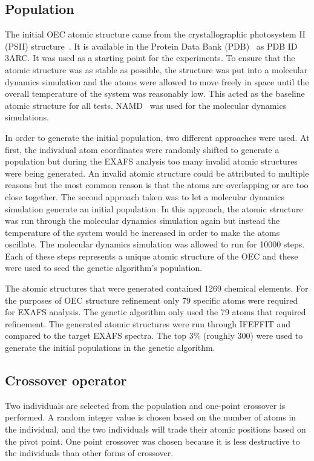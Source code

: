 \documentclass[conference]{IEEEtran}
\begin{document}
\subsection{Population}
\label{sec:population}

The initial OEC atomic structure came from the crystallographic photosystem II (PSII) structure~\cite{umena2011crystal}. It is available in the Protein Data Bank (PDB)~\cite{databank} as PDB ID 3ARC. It was used as a starting point for the experiments. To ensure that the atomic structure was as stable as possible, the structure was put into a molecular dynamics simulation and the atoms were allowed to move freely in space until the overall temperature of the system was reasonably low. This acted as the baseline atomic structure for all tests. NAMD~\cite{namd} was used for the molecular dynamics simulations.

In order to generate the initial population, two different approaches were used. At first, the individual atom coordinates were randomly shifted to generate a population but during the EXAFS analysis too many invalid atomic structures were being generated. An invalid atomic structure could be attributed to multiple reasons but the most common reason is that the atoms are overlapping or are too close together. The second approach taken was to let a molecular dynamics simulation generate an initial population. In this approach, the atomic structure was run through the molecular dynamics simulation again but instead the temperature of the system would be increased in order to make the atoms oscillate. The molecular dynamics simulation was allowed to run for 10000 steps. Each of these steps represents a unique atomic structure of the OEC and these were used to seed the genetic algorithm's population.

The atomic structures that were generated contained 1269 chemical elements. For the purposes of OEC structure refinement only 79 specific atoms were required for EXAFS analysis. The genetic algorithm only used the 79 atoms that required refinement. The generated atomic structures were run through IFEFFIT and compared to the target EXAFS spectra. The top 3\% (roughly 300) were used to generate the initial populations in the genetic algorithm.

\subsection{Crossover operator}

Two individuals are selected from the population and one-point crossover is performed. A random integer value is chosen based on the number of atoms in the individual, and the two individuals will trade their atomic positions based on the pivot point. One point crossover was chosen because it is less destructive to the individuals than other forms of crossover.
\end{document}
